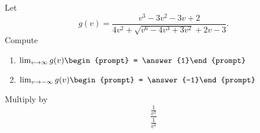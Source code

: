 \documentclass{ximera}
\author{Bart Snapp}
\begin{document}
\begin{exercise}
Let 
\[
g(v) = \frac{v^3-3 v^2-3 v+2}{4 v^2+\sqrt{v^6-4 v^3+3 v^2}+2 v-3}.
\]
Compute
\begin{enumerate}
\item $\lim_{v\to \infty} g(v) \begin{prompt} = \answer{1}\end{prompt}$
\item $\lim_{v\to -\infty}g(v) \begin{prompt} = \answer{-1}\end{prompt}$
\end{enumerate}
\begin{hint}
Multiply by
\[
\frac{\frac{1}{v^3}}{\frac{1}{v^3}}
\]
\end{hint}
\end{exercise}
\end{document}
